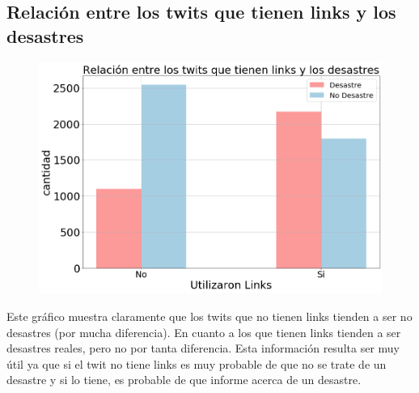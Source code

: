 \documentclass[titlepage,a4paper]{article}
\begin{document}
\subsection{\Large Relación entre los twits que tienen links y los desastres}
{\Large
\begin{figure}[H]
 \centering
 \includegraphics[width=1\textwidth, height=1\textheight, keepaspectratio]{graficos/relacion_links.png}
\end{figure}
Este gráfico muestra claramente que los twits que no tienen links tienden a ser no desastres (por mucha diferencia). En cuanto a los que tienen links tienden a ser desastres reales, pero no por tanta diferencia. Esta información resulta ser muy útil ya que si el twit no tiene links es muy probable de que no se trate de un desastre y si lo tiene, es probable de que informe acerca de un desastre.
\par}
\end{document}
